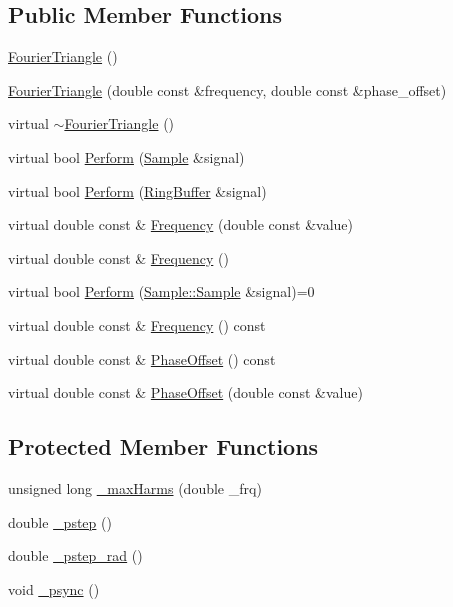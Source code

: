\subsection*{Public Member Functions}
\begin{DoxyCompactItemize}
\item 
\hyperlink{classDSG_1_1FourierTriangle_a5274aa0468d5e566f5a23d517b0e0767}{Fourier\+Triangle} ()
\item 
\hyperlink{classDSG_1_1FourierTriangle_a1d23bd3033e60968f2cd17610c424b86}{Fourier\+Triangle} (double const \&frequency, double const \&phase\+\_\+offset)
\item 
virtual \hyperlink{classDSG_1_1FourierTriangle_a9844e13eed3b8b5583d81a14d2e4c87b}{$\sim$\+Fourier\+Triangle} ()
\item 
virtual bool \hyperlink{classDSG_1_1FourierTriangle_ae927efb96f8d40f620dd02bdaaeef4d5}{Perform} (\hyperlink{classDSG_1_1Sample}{Sample} \&signal)
\item 
virtual bool \hyperlink{classDSG_1_1FourierTriangle_a017e2b59123ff3afa9a5c0e833e5f482}{Perform} (\hyperlink{classDSG_1_1RingBuffer}{Ring\+Buffer} \&signal)
\item 
virtual double const \& \hyperlink{classDSG_1_1FourierTriangle_aebb275eee9fb923636a8db5e4aa90b39}{Frequency} (double const \&value)
\item 
virtual double const \& \hyperlink{classDSG_1_1FourierTriangle_a32e7b869c66dc84ffc832965309495ed}{Frequency} ()
\item 
virtual bool \hyperlink{classDSG_1_1SignalProcess_afdb8220100418893950c1161dd24db67}{Perform} (\hyperlink{classDSG_1_1Sample_aaf2e30d73911eccea99b53eeee15b612}{Sample\+::\+Sample} \&signal)=0
\item 
virtual double const \& \hyperlink{classDSG_1_1SignalGenerator_aedac746c5a70818d120858542ecb7c45}{Frequency} () const 
\item 
virtual double const \& \hyperlink{classDSG_1_1SignalGenerator_a1ce521847edd0b837fd840998f906b4b}{Phase\+Offset} () const 
\item 
virtual double const \& \hyperlink{classDSG_1_1SignalGenerator_a08b71b1f30ba65e629642c570291dc0e}{Phase\+Offset} (double const \&value)
\end{DoxyCompactItemize}
\subsection*{Protected Member Functions}
\begin{DoxyCompactItemize}
\item 
unsigned long \hyperlink{classDSG_1_1FourierGenerator_a6b6e3bbad8ff7443d9ed71f4cdf76739}{\+\_\+max\+Harms} (double \+\_\+frq)
\item 
double \hyperlink{classDSG_1_1SignalGenerator_ac0d781b8673b3a283bf7c133290ede50}{\+\_\+pstep} ()
\item 
double \hyperlink{classDSG_1_1SignalGenerator_ae660eb4caa88b8d278f8d24d0908a487}{\+\_\+pstep\+\_\+rad} ()
\item 
void \hyperlink{classDSG_1_1SignalGenerator_a05baccb38d1e52860d4fcf7cb8430efc}{\+\_\+psync} ()
\end{DoxyCompactItemize}
